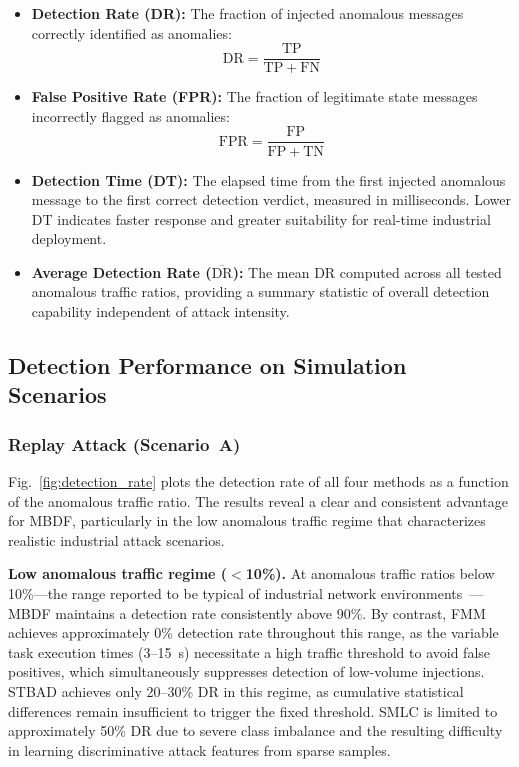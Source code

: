 \documentclass[manuscript,screen,review]{acmart}
\begin{document}
\begin{itemize}
\item \textbf{Detection Rate (DR):} The fraction of
injected anomalous messages correctly identified as
anomalies:
\begin{equation}
\mathrm{DR} = \frac{\mathrm{TP}}{\mathrm{TP}+\mathrm{FN}}
\label{eq:dr}
\end{equation}

\item \textbf{False Positive Rate (FPR):} The fraction
of legitimate state messages incorrectly flagged as
anomalies:
\begin{equation}
\mathrm{FPR} = \frac{\mathrm{FP}}{\mathrm{FP}+\mathrm{TN}}
\label{eq:fpr}
\end{equation}

\item \textbf{Detection Time (DT):} The elapsed time
from the first injected anomalous message to the first
correct detection verdict, measured in milliseconds.
Lower DT indicates faster response and greater
suitability for real-time industrial deployment.

\item \textbf{Average Detection Rate
($\overline{\mathrm{DR}}$):} The mean DR computed across
all tested anomalous traffic ratios, providing a summary
statistic of overall detection capability independent of
attack intensity.
\end{itemize}

\subsection{Detection Performance on Simulation Scenarios}
\label{sec:sim_results}

\subsubsection{Replay Attack (Scenario~A)}
\label{sec:replay_results}

Fig.~\ref{fig:detection_rate} plots the detection rate of
all four methods as a function of the anomalous traffic
ratio. The results reveal a clear and consistent advantage
for MBDF, particularly in the low anomalous traffic regime
that characterizes realistic industrial attack scenarios.

\textbf{Low anomalous traffic regime ($<$10\%).}
At anomalous traffic ratios below 10\%---the range
reported to be typical of industrial network
environments~\cite{ref26}---MBDF maintains a detection
rate consistently above 90\%. By contrast, FMM achieves
approximately 0\% detection rate throughout this range,
as the variable task execution times (3--15~s) necessitate
a high traffic threshold to avoid false positives, which
simultaneously suppresses detection of low-volume
injections. STBAD achieves only 20--30\% DR in this
regime, as cumulative statistical differences remain
insufficient to trigger the fixed threshold. SMLC is
limited to approximately 50\% DR due to severe class
imbalance and the resulting difficulty in learning
discriminative attack features from sparse samples.
\end{document}
